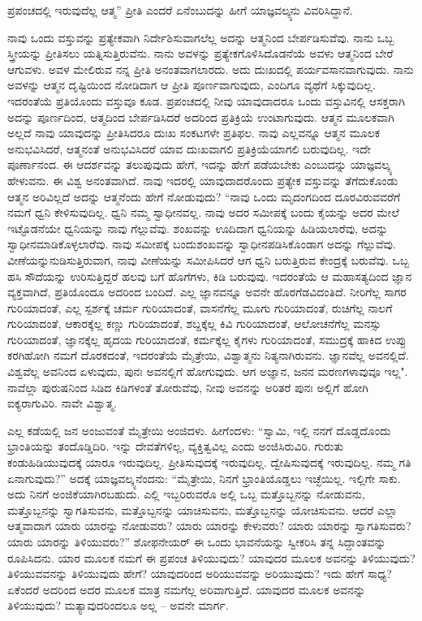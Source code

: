 ಪ್ರಪಂಚದಲ್ಲಿ ಇರುವುದೆಲ್ಲ ಆತ್ಮ” ಪ್ರೀತಿ ಎಂದರೆ ಏನೆಂಬುದನ್ನು ಹೀಗೆ ಯಾಜ್ಞವಲ್ಕ್ಯನು ವಿವರಿಸಿದ್ದಾನೆ.

ನಾವು ಒಂದು ವಸ್ತುವನ್ನು ಪ್ರತ್ಯೇಕವಾಗಿ ನಿರ್ದೇಶಿಸುವಾಗಲೆಲ್ಲ ಅದನ್ನು ಆತ್ಮನಿಂದ ಬೇರ್ಪಡಿಸುವೆವು. ನಾನು ಒಬ್ಬ ಸ್ತ್ರೀಯನ್ನು ಪ್ರೀತಿಸಲು ಯತ್ನಿಸುತ್ತಿರುವೆನು. ನಾನು ಅವಳನ್ನು ಪ್ರತ್ಯೇಕಗೊಳಿಸಿದೊಡನೆಯೆ ಅವಳು ಆತ್ಮನಿಂದ ಬೇರೆ ಆಗುವಳು. ಅವಳ ಮೇಲಿರುವ ನನ್ನ ಪ್ರೀತಿ ಅನಂತವಾಗಲಾರದು. ಅದು ದುಃಖದಲ್ಲಿ ಪರ್ಯವಸಾನವಾಗುವುದು. ನಾನು ಅವಳನ್ನು ಆತ್ಮನ ದೃಷ್ಟಿಯಿಂದ ನೋಡಿದಾಗ ಆ ಪ್ರೀತಿ ಪೂರ್ಣವಾಗುವುದು, ಎಂದಿಗೂ ವ್ಯಥೆಗೆ ಸಿಕ್ಕುವುದಿಲ್ಲ. ಇದರಂತೆಯೆ ಪ್ರತಿಯೊಂದು ವಸ್ತುವೂ ಕೂಡ. ಪ್ರಪಂಚದಲ್ಲಿ ನೀವು ಯಾವುದಾದರೂ ಒಂದು ವಸ್ತುವಿನಲ್ಲಿ ಆಸಕ್ತರಾಗಿ ಅದನ್ನು ಪೂರ್ಣದಿಂದ, ಆತ್ಮದಿಂದ ಬೇರ್ಪಡಿಸಿದರೆ ಅದರಿಂದ ಪ್ರತಿಕ್ರಿಯೆ ಉಂಟಾಗುವುದು. ಆತ್ಮನ ಮೂಲಕವಾಗಿ ಅಲ್ಲದೆ ನಾವು ಯಾವುದನ್ನು ಪ್ರೀತಿಸಿದರೂ ದುಃಖ ಸಂಕಟಗಳೇ ಪ್ರತಿಫಲ. ನಾವು ಎಲ್ಲವನ್ನೂ ಆತ್ಮನ ಮೂಲಕ ಅನುಭವಿಸಿದರೆ, ಆತ್ಮನಂತೆ ಅನುಭವಿಸಿದರೆ ಯಾವ ದುಃಖವಾಗಲಿ ಪ್ರತಿಕ್ರಿಯೆಯಾಗಲಿ ಬರುವುದಿಲ್ಲ. ಇದೇ ಪೂರ್ಣಾನಂದ. ಈ ಆದರ್ಶವನ್ನು ತಲುಪುವುದು ಹೇಗೆ, ಇದನ್ನು ಹೇಗೆ ಪಡೆಯಬೇಕು ಎಂಬುದನ್ನು ಯಾಜ್ಞವಲ್ಕ್ಯ ಹೇಳುವನು. ಈ ವಿಶ್ವ ಅನಂತವಾಗಿದೆ. ನಾವು ಇದರಲ್ಲಿ ಯಾವುದಾದರೊಂದು ಪ್ರತ್ಯೇಕ ವಸ್ತುವನ್ನು ತೆಗೆದುಕೊಂಡು ಆತ್ಮನ ಅರಿವಿಲ್ಲದೆ ಅದನ್ನು ಆತ್ಮನೆಂದು ಹೇಗೆ ನೋಡುವುದು? “ನಾವು ಒಂದು ಮೃದಂಗದಿಂದ ದೂರವಿರುವವರೆಗೆ ನಮಗೆ ಧ್ವನಿ ಕೇಳಿಸುವುದಿಲ್ಲ. ಧ್ವನಿ ನಮ್ಮ ಸ್ವಾಧೀನವಲ್ಲ. ನಾವು ಅದರ ಸಮೀಪಕ್ಕೆ ಬಂದು ಕೈಯನ್ನು ಅದರ ಮೇಲೆ ಇಟ್ಟೊಡನೆಯೇ ಧ್ವನಿಯನ್ನು ನಾವು ಗೆಲ್ಲುವೆವು. ಶಂಖವನ್ನು ಊದಿದಾಗ ಧ್ವನಿಯನ್ನು ಹಿಡಿಯಲಾರೆವು, ಅದನ್ನು ಸ್ವಾಧೀನಮಾಡಿಕೊಳ್ಳಲಾರೆವು. ನಾವು ಸಮೀಪಕ್ಕೆ ಬಂದು\break ಶಂಖವನ್ನು ಸ್ವಾಧೀನಪಡಿಸಿಕೊಂಡಾಗ ಅದನ್ನು ಗೆಲ್ಲುವೆವು. ವೀಣೆಯನ್ನು\break ನುಡಿಸುತ್ತಿರುವಾಗ, ನಾವು ವೀಣೆಯನ್ನು ಸಮೀಪಿಸಿದರೆ ಆಗ ಧ್ವನಿ ಬರುತ್ತಿರುವ ಕೇಂದ್ರಕ್ಕೆ ಬರುವೆವು. ಒಬ್ಬ ಹಸಿ ಸೌದೆಯನ್ನು ಉರಿಸುತ್ತಿದ್ದರೆ ಹಲವು ಬಗೆ ಹೊಗೆಗಳು, ಕಿಡಿ ಬರುವುವು. ಇದರಂತೆಯೆ ಆ ಮಹಾಸತ್ಯದಿಂದ ಜ್ಞಾನ ವ್ಯಕ್ತವಾಗಿದೆ, ಪ್ರತಿಯೊಂದೂ ಅದರಿಂದ ಬಂದಿದೆ. ಎಲ್ಲ ಜ್ಞಾನವನ್ನೂ ಅವನೇ ಹೊರಗೆಡವಿದಂತಿದೆ. ನೀರಿಗೆಲ್ಲ ಸಾಗರ ಗುರಿಯಾದಂತೆ, ಎಲ್ಲ ಸ್ಪರ್ಶಕ್ಕೆ ಚರ್ಮ ಗುರಿಯಾದಂತೆ, ವಾಸನೆಗೆಲ್ಲ ಮೂಗು ಗುರಿಯಾದಂತೆ, ರುಚಿಗೆಲ್ಲ ನಾಲಗೆ ಗುರಿಯಾದಂತೆ, ಆಕಾರಕ್ಕೆಲ್ಲ ಕಣ್ಣು ಗುರಿಯಾದಂತೆ, ಶಬ್ದಕ್ಕೆಲ್ಲ ಕಿವಿ ಗುರಿಯಾದಂತೆ, ಆಲೋಚನೆಗೆಲ್ಲ ಮನಸ್ಸು ಗುರಿಯಾದಂತೆ, ಜ್ಞಾನಕ್ಕೆಲ್ಲ ಹೃದಯ ಗುರಿಯಾದಂತೆ, ಕರ್ಮಕ್ಕೆಲ್ಲ ಕೈಗಳು ಗುರಿಯಾದಂತೆ, ಸಮುದ್ರಕ್ಕೆ ಹಾಕಿದ ಉಪ್ಪು ಕರಗಿಹೋಗಿ ನಮಗೆ ದೊರಕದಂತೆ, ಇದರಂತೆಯೆ ಮೈತ್ರೇಯಿ, ವಿಶ್ವಾತ್ಮನು ನಿತ್ಯನಾಗಿರುವನು. ಜ್ಞಾನವೆಲ್ಲ ಅವನಲ್ಲಿದೆ. ವಿಶ್ವವೆಲ್ಲ ಅವನಿಂದ ಏಳುವುದು, ಪುನಃ ಅವನಲ್ಲಿಗೆ ಹೋಗುವುದು. ಆಗ ಅಜ್ಞಾನ, ಜನನ ಮರಣಗಳಾವುವೂ ಇಲ್ಲ". ನಾವೆಲ್ಲಾ ಪುರುಷನಿಂದ ಸಿಡಿದ ಕಿಡಿಗಳಂತೆ ತೋರುವೆವು, ನೀವು ಅವನನ್ನು ಅರಿತರೆ ಪುನಃ ಅಲ್ಲಿಗೆ ಹೋಗಿ ಐಕ್ಯರಾಗುವಿರಿ. ನಾವೇ ವಿಶ್ವಾತ್ಮ.

ಎಲ್ಲ ಕಡೆಯಲ್ಲಿ ಜನ ಅಂಜುವಂತೆ ಮೈತ್ರೇಯಿ ಅಂಜಿದಳು. ಹೀಗೆಂದಳು: “ಸ್ವಾಮಿ, ಇಲ್ಲಿ ನನಗೆ ದೊಡ್ಡದೊಂದು ಭ್ರಾಂತಿಯನ್ನು ತಂದೊಡ್ಡಿದಿರಿ. ಇನ್ನು ದೇವತೆಗಳಿಲ್ಲ, ವ್ಯಕ್ತಿತ್ವವಿಲ್ಲ ಎಂದು ಅಂಜಿಸಿರುವಿರಿ. ಗುರುತು ಕಂಡುಹಿಡಿಯುವುದಕ್ಕೆ ಯಾರೂ ಇರುವುದಿಲ್ಲ. ಪ್ರೀತಿಸುವುದಕ್ಕೆ ಇರುವುದಿಲ್ಲ. ದ್ವೇಷಿಸುವುದಕ್ಕೆ ಇರುವುದಿಲ್ಲ. ನಮ್ಮ ಗತಿ ಏನಾಗುವುದು?'' ಅದಕ್ಕೆ ಯಾಜ್ಞವಲ್ಕ್ಯನೆಂದನು: “ಮೈತ್ರೇಯಿ, ನಿನಗೆ ಭ್ರಾಂತಿಯೊಡ್ಡಲು ಇಚ್ಛೆಯಿಲ್ಲ. ಇಲ್ಲಿಗೇ ಸಾಕು. ಅದು ನಿನಗೆ ಅಂಜಿಕೆಯಾಗಿರಬಹುದು. ಎಲ್ಲಿ ಇಬ್ಬರಿರುವರೊ ಅಲ್ಲಿ ಒಬ್ಬ ಮತ್ತೊಬ್ಬನನ್ನು ನೋಡುವನು, ಮತ್ತೊಬ್ಬನನ್ನು ಸ್ವಾಗತಿಸುವನು, ಮತ್ತೊಬ್ಬನನ್ನು ಯಾಚಿಸುವನು, ಮತ್ತೊಬ್ಬನನ್ನು ಯೋಚಿಸುವನು. ಆದರೆ ಎಲ್ಲಾ ಆತ್ಮವಾದಾಗ ಯಾರು ಯಾರನ್ನು ನೋಡುವರು? ಯಾರು ಯಾರನ್ನು ಕೇಳುವರು? ಯಾರು ಯಾರನ್ನು ಸ್ವಾಗತಿಸುವರು? ಯಾರು ಯಾರನ್ನು ತಿಳಿಯುವರು?” ಶೋಫನೇಯರ್ ಈ ಒಂದು ಭಾವನೆಯನ್ನು ಸ್ವೀಕರಿಸಿ ತನ್ನ ಸಿದ್ದಾಂತವನ್ನು ರೂಪಿಸಿದನು. ಯಾರ ಮೂಲಕ ನಮಗೆ ಈ ಪ್ರಪಂಚ ತಿಳಿಯುವುದು? ಯಾವುದರ ಮೂಲಕ ಅವನನ್ನು ತಿಳಿಯುವುದು? ತಿಳಿಯುವವನನ್ನು ತಿಳಿಯುವುದು ಹೇಗೆ? ಯಾವುದರಿಂದ ಅರಿಯುವವನ್ನು ಅರಿಯುವುದು? ಇದು ಹೇಗೆ ಸಾಧ್ಯ? ಏಕೆಂದರೆ ಅದರಿಂದ ಅದರ ಮೂಲಕ ಮಾತ್ರ ನಮಗೆಲ್ಲ ಅರಿವಾಗುತ್ತಿದೆ. ಯಾವುದರ ಮೂಲಕ ಅವನನ್ನು ತಿಳಿಯುವುದು? ಮತ್ಯಾವುದರಿಂದಲೂ ಅಲ್ಲ – ಅವನೇ ಮಾರ್ಗ.


